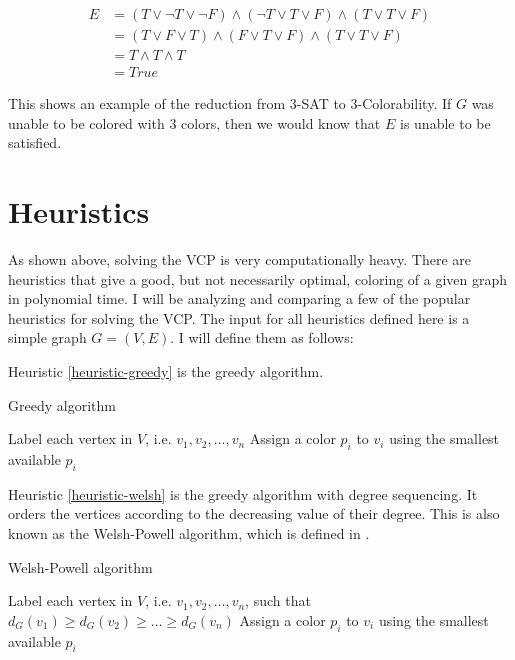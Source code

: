 \documentclass{article}
\newcounter{heuristic} \setcounter{heuristic}{0}
\theoremstyle{definition}
\begin{document}
\begin{align*}
E &= \left( T \vee \neg T \vee \neg F \right) \wedge \left( \neg T \vee T \vee F \right) \wedge \left(T \vee T \vee F \right) \\
&= \left( T \vee F \vee T \right) \wedge \left( F \vee T \vee F \right) \wedge \left(T \vee T \vee F \right) \\
&= T \wedge T \wedge T \\
&= True
\end{align*}

This shows an example of the reduction from 3-SAT to 3-Colorability. If \(G\) was unable to be colored with 3 colors, then we would know that \(E\) is unable to be satisfied.




\section*{Heuristics}
As shown above, solving the VCP is very computationally heavy. There are heuristics that give a good, but not necessarily optimal, coloring of a given graph in polynomial time. I will be analyzing and comparing a few of the popular heuristics for solving the VCP. The input for all heuristics defined here is a simple graph \(G = (V, E)\). I will define them as follows:

\heuristic{}\label{heuristic-greedy}

Heuristic \ref{heuristic-greedy} is the greedy algorithm.

\begin{algorithm}
\caption{Greedy algorithm}
\begin{algorithmic}[1]
\State Label each vertex in $V$, i.e. $v_1, v_2, \dots, v_n$
\State Assign a color $p_i$ to $v_i$ using the smallest available $p_i$
\EndFor
\end{algorithmic}
\end{algorithm}

\heuristic{}\label{heuristic-welsh}

Heuristic \ref{heuristic-welsh} is the greedy algorithm with degree sequencing. It orders the vertices according to the decreasing value of their degree. This is also known as the Welsh-Powell algorithm, which is defined in \cite{welsh}.

\begin{algorithm}
\caption{Welsh-Powell algorithm}
\begin{algorithmic}[1]
\State Label each vertex in $V$, i.e. $v_1, v_2, \dots, v_n$, such that $d_G(v_1) \geq d_G(v_2) \geq \dots \geq d_G(v_n)$
\State Assign a color $p_i$ to $v_i$ using the smallest available $p_i$
\EndFor
\end{algorithmic}
\end{algorithm}
\end{document}
